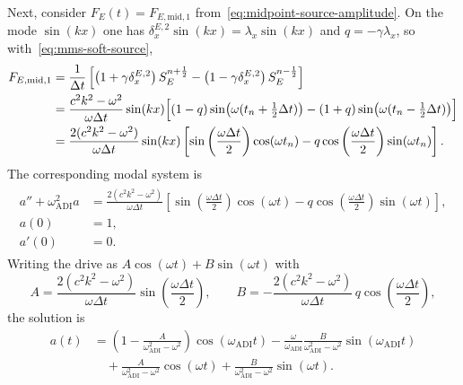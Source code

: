 \documentclass{article}
\numberwithin{figure}{section}
\begin{document}
Next, consider $F_E(t)=F_{E,\mathrm{mid,1}}$ from~\eqref{eq:midpoint-source-amplitude}.
On the mode $\sin(kx)$ one has $\delta_x^{E,2}\sin(kx)=\lambda_x\sin(kx)$ and $q=-\gamma\lambda_x$, so with~\eqref{eq:mms-soft-source},
\begin{align}
    \begin{split}
        F_{E,\mathrm{mid,1}}
         & =\frac{1}{\Delta t}\left[\left(1+\gamma\delta_x^{E,2}\right)S_E^{n+\frac{1}{2}}-\left(1-\gamma\delta_x^{E,2}\right)S_E^{n-\frac{1}{2}}\right] \\
         & =\frac{c^2k^2-\omega^2}{\omega\Delta t}\sin(kx)\Bigl[
            (1-q)\sin\bigl(\omega(t_n+\tfrac12\Delta t)\bigr)
            -(1+q)\sin\bigl(\omega(t_n-\tfrac12\Delta t)\bigr)
        \Bigr]                                                                                                                                       \\
         & =\frac{2(c^2k^2-\omega^2)}{\omega\Delta t}\sin(kx)\left[
            \sin\left(\frac{\omega\Delta t}{2}\right)\cos(\omega t_n)
            -q\cos\left(\frac{\omega\Delta t}{2}\right)\sin(\omega t_n)
            \right].
    \end{split}
    \label{eq:mms-F-mid1-real}
\end{align}
The corresponding modal system is
\begin{align}
    \begin{split}
        a''+\omega_{\mathrm{ADI}}^2 a
         & =\frac{2(c^2k^2-\omega^2)}{\omega\Delta t}\left[
            \sin\left(\frac{\omega\Delta t}{2}\right)\cos(\omega t)
            -q\cos\left(\frac{\omega\Delta t}{2}\right)\sin(\omega t)
        \right],                                            \\
        a(0)
         & =1,                                              \\
        a'(0)
         & =0.
    \end{split}
    \label{eq:mms-forced-mid1}
\end{align}
Writing the drive as $A\cos(\omega t)+B\sin(\omega t)$ with
\begin{equation}
    A=\frac{2(c^2k^2-\omega^2)}{\omega\Delta t}\sin\left(\frac{\omega\Delta t}{2}\right),\qquad
    B=-\frac{2(c^2k^2-\omega^2)}{\omega\Delta t}\,q\cos\left(\frac{\omega\Delta t}{2}\right),
    \label{eq:mms-mid1-AB}
\end{equation}
the solution is
\begin{equation}
    \begin{aligned}
        a(t)
         & =\left(1-\frac{A}{\omega_{\mathrm{ADI}}^2-\omega^2}\right)\cos(\omega_{\mathrm{ADI}}t)
        -\frac{\omega}{\omega_{\mathrm{ADI}}}\frac{B}{\omega_{\mathrm{ADI}}^2-\omega^2}\sin(\omega_{\mathrm{ADI}}t) \\
         & \quad+\frac{A}{\omega_{\mathrm{ADI}}^2-\omega^2}\cos(\omega t)
        +\frac{B}{\omega_{\mathrm{ADI}}^2-\omega^2}\sin(\omega t).
    \end{aligned}
    \label{eq:mms-solution-mid1}
\end{equation}
\end{document}
